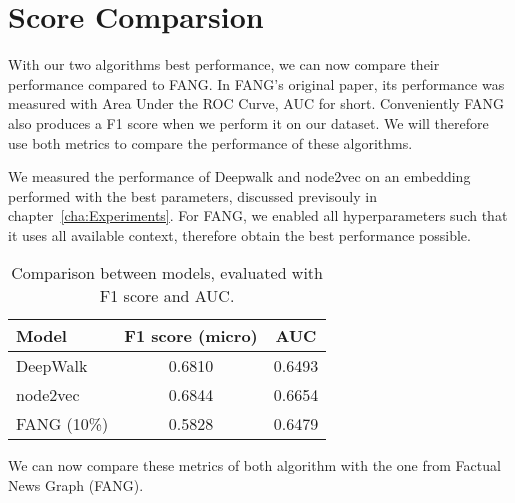 \newpage
\section{Score Comparsion}

With our two algorithms best performance, we can now compare their performance compared to FANG.
In FANG's original paper, its performance was measured with Area Under the ROC Curve, AUC for short.
Conveniently FANG also produces a F1 score when we perform it on our dataset.
We will therefore use both metrics to compare the performance of these algorithms.

We measured the performance of Deepwalk and node2vec on an embedding performed with the best parameters, discussed previsouly in chapter~\ref{cha:Experiments}.
For FANG, we enabled all hyperparameters such that it uses all available context, therefore obtain the best performance possible.

\begin{table}[h]
    \centering
    \caption{Comparison between models, evaluated with F1 score and AUC.}
    \label{tab:f1_auc}
    \begin{tabular}{lcc}
        \toprule
        Model & F1 score (micro) & AUC \\
        \midrule
        DeepWalk & 0.6810 & 0.6493 \\
        node2vec & 0.6844 & 0.6654 \\
        FANG (10\%) & 0.5828 & 0.6479 \\
        \bottomrule
    \end{tabular}
\end{table}
We can now compare these metrics of both algorithm with the one from Factual News Graph (FANG).

\iffalse
\subsubsection{Notes}

Just like Deepwalk and node2vec, FANG produces both F1 score and AUC using the sklearn library.
The AUC uses the default ($average=macro$).

However the F1 produced uses $average=binary$.
We have F1 micro and macro score for DeepWalk and node2vec.
Which one should we use, or do we need to run the program with binary F1?



\fi
